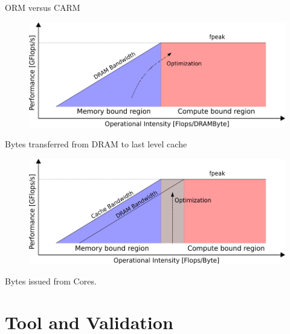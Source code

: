 \begin{nframe}{ORM versus CARM}
  \begin{minipage}{.65\textwidth}
  \begin{figure}
    \centering
    \includegraphics[width=\textwidth, height=.3\paperheight, keepaspectratio]{pictures/roofline_chart.png}
  \end{figure}
  \end{minipage}%
  \begin{minipage}{.3\textwidth}
    Bytes transferred from DRAM to last level cache
  \end{minipage}

  \vspace{5mm}
  \begin{minipage}{.65\textwidth}
  \begin{figure}
    \centering
    \includegraphics[width=\textwidth, height=.3\paperheight, keepaspectratio]{pictures/CARM_chart.png}
  \end{figure}
  \end{minipage}%
  \begin{minipage}{.3\textwidth}
    Bytes issued from Cores.
  \end{minipage}
\end{nframe}


\section{Tool and Validation}

